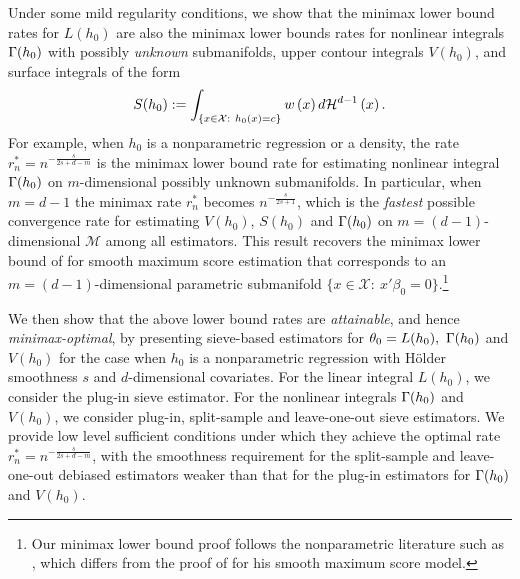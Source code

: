 \documentclass[12pt,american]{article}
\theoremstyle{definition}
\theoremstyle{plain}
\theoremstyle{definition}
\theoremstyle{plain}
\theoremstyle{plain}
\theoremstyle{plain}
\theoremstyle{plain}
\theoremstyle{plain}
\begin{document}
Under some mild regularity conditions, we show that the minimax lower bound rates for $L(h_0)$ are also the minimax lower bounds rates for nonlinear integrals $\Gamma(h_0)$ with possibly \textit{unknown} submanifolds, upper contour integrals $V(h_0)$, and surface integrals of the form
\begin{equation}
  S(h_0):=\int_{\left\{x\in \mathcal{X}:~ h_{0}\left(x\right)=c\right\} } w\left(x\right)d{\cal H}^{d-1}\left(x\right).\label{eq:S}
\end{equation}
For example, when $h_{0}$ is a nonparametric regression or a density, the rate $r^*_n=n^{-\frac{s}{2s+d-m}}$ is the minimax lower bound rate for estimating nonlinear integral $\Gamma(h_0)$ on $m$-dimensional possibly unknown submanifolds. In particular, when $m=d-1$ the minimax rate $r^*_n$ becomes $n^{-\frac{s}{2s+1}}$, which is the \textit{fastest} possible convergence rate for estimating $V(h_0)$, $S(h_0)$ and $\Gamma(h_0)$ on $m=(d-1)$-dimensional $\mathcal{M}$ among all estimators. This result recovers the minimax lower bound of \cite{horowitz1993et} for smooth maximum score estimation that corresponds to an $m=(d-1)$-dimensional parametric submanifold $\{x\in\mathcal{X}:~x'\beta_0=0\}$.\footnote{Our minimax lower bound proof follows the nonparametric literature such as \cite{Tsybakov2009}, which differs from the proof of \cite{horowitz1993et} for his smooth maximum score model.}

 
We then show that the above lower bound rates are \textit{attainable}, and hence \textit{minimax-optimal}, by presenting sieve-based estimators for $\theta_0=L(h_0),~\Gamma(h_0)$ and $V(h_0)$ for the case when $h_0$ is a nonparametric regression with H\"{o}lder smoothness $s$ and $d$-dimensional covariates. For the linear integral $L(h_0)$, we consider the plug-in sieve estimator. For the nonlinear integrals $\Gamma(h_0)$ and $V(h_0)$, we consider plug-in, split-sample and leave-one-out sieve estimators. We provide low level sufficient conditions under which they achieve the optimal rate $r^*_n=n^{-\frac{s}{2s+d-m}}$, with the smoothness requirement for the split-sample and leave-one-out debiased estimators weaker than that for the plug-in estimators for $\Gamma(h_0)$ and $V(h_0)$.

\end{document}
